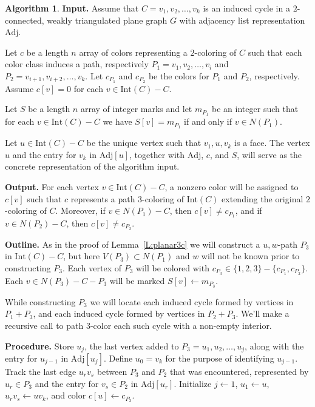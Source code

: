 \documentclass[12pt,letterpaper]{article}
\theoremstyle{plain}
\theoremstyle{definition}
\theoremstyle{break}
\newtheorem{algorithm}[lemma]{Algorithm}     %
\begin{document}
\begin{algorithm}\label{A:poh_linear}
\textbf{Input.} Assume that $C=v_1,v_2,\ldots,v_k$ is an induced cycle in a
$2$-connected, weakly triangulated plane
graph $G$ with adjacency list representation $\text{Adj}$.

Let $c$ be a length $n$ array of colors
representing a $2$-coloring of $C$ such
that each color class induces a path, respectively $P_1=v_1,v_2,\ldots,v_i$ and
$P_2=v_{i+1},v_{i+2},\ldots,v_k$. Let $c_{P_1}$ and $c_{P_2}$ be the colors
for $P_1$ and $P_2$, respectively. Assume $c[v]=0$ for each
$v\in\text{Int}(C)-C$.

Let $S$ be a length $n$ array of integer marks and let $m_{P_1}$ be an integer
such that for each $v\in\text{Int}(C)-C$ we have $S[v]=m_{P_1}$ if and only if
$v\in N(P_1)$.

Let $u\in\text{Int}(C)-C$ be the unique vertex such that $v_1,u,v_k$ is a face.
The vertex $u$ and the entry for $v_k$ in $\text{Adj}[u]$, together
with $\text{Adj}$, $c$, and $S$, will serve as the concrete
representation of the algorithm input.

\textbf{Output.} For each vertex $v\in\text{Int}(C)-C$, a nonzero color will be
assigned to $c[v]$ such that $c$ represents a path $3$-coloring of
$\text{Int}(C)$ extending the original $2$-coloring of $C$. Moreover, if
$v\in N(P_1)-C$, then $c[v]\ne c_{P_1}$, and if $v\in N(P_2)-C$, then
$c[v]\ne c_{P_2}$.

\textbf{Outline.} As in the proof of Lemma~\ref{L:planar3c} we will
construct a $u,w$-path $P_3$
in $\text{Int}(C)-C$, but here $V(P_3)\subset N(P_1)$ and $w$
will not be known prior to constructing $P_3$.
Each vertex of $P_3$ will be colored with
$c_{P_3}\in\{1,2,3\}-\{c_{P_1},c_{P_2}\}$. Each $v\in
N(P_3)-C-P_3$ will be marked $S[v]\leftarrow m_{P_3}$.

While constructing $P_3$ we will locate each induced cycle formed by
vertices in $P_1+P_3$, and each induced cycle formed by
vertices in $P_2+P_3$. We'll make a recursive call to path $3$-color
each such cycle with a non-empty interior.

\textbf{Procedure.}
Store $u_j$, the last
vertex added to $P_3=u_1,u_2,\ldots,u_j$, along with the entry for
$u_{j-1}$ in $\text{Adj}[u_j]$. Define $u_0=v_k$ for the purpose
of identifying $u_{j-1}$. Track the
last edge $u_rv_s$ between $P_3$ and $P_2$ that was encountered,
represented by
$u_r\in P_3$ and the entry for $v_s\in P_2$ in $\text{Adj}[u_r]$.
Initialize $j\leftarrow 1$, $u_1\leftarrow u$, $u_rv_s\leftarrow uv_k$,
and color $c[u]\leftarrow c_{P_3}$. 


\end{algorithm}
\end{document}
